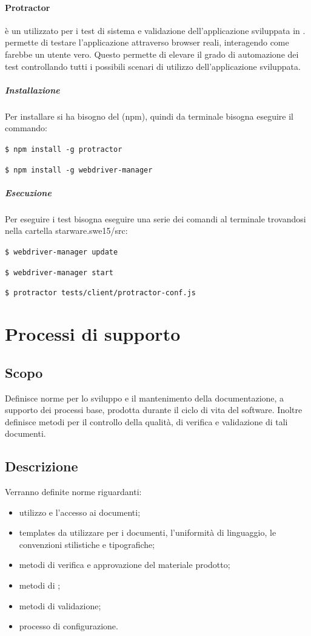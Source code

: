 \documentclass[12pt,a4paper]{article}
\begin{document}
\paragraph{Protractor} \label{protractor}
  è un  utilizzato per i test di sistema e validazione dell'applicazione sviluppata in .  permette di testare l'applicazione attraverso browser reali, interagendo come farebbe un utente vero.
Questo permette di elevare il grado di automazione dei test controllando tutti i possibili scenari di utilizzo dell'applicazione sviluppata.
\subparagraph{Installazione}
Per installare  si ha bisogno del  (npm), quindi da terminale bisogna eseguire il commando:
\begin{center}
	\texttt{\$ npm install -g protractor}
\end{center}
\begin{center}
	\texttt{\$ npm install -g webdriver-manager}  
\end{center}
\subparagraph{Esecuzione}
Per eseguire i test bisogna eseguire una serie dei comandi al terminale trovandosi nella cartella starware.swe15/src: 
\begin{center}
	\texttt{\$ webdriver-manager update}
\end{center}
\begin{center}
	\texttt{\$ webdriver-manager start}
\end{center}
\begin{center}
	\texttt{\$ protractor tests/client/protractor-conf.js}
\end{center}
\newpage

\section{Processi di supporto}

\subsection{Scopo}
Definisce norme per lo sviluppo e il mantenimento della documentazione, a supporto dei processi base, prodotta durante il ciclo di vita del software. Inoltre definisce metodi per il controllo della qualità, di verifica e validazione di tali documenti.

\subsection{Descrizione}
Verranno definite norme riguardanti:
\begin{itemize}
	\item utilizzo e l'accesso ai documenti;
	\item templates da utilizzare per i documenti, l'uniformità di linguaggio, le convenzioni stilistiche e tipografiche;
	\item metodi di verifica e approvazione del materiale prodotto;
	\item metodi di ;
	\item metodi di validazione;
	\item processo di configurazione.
\end{itemize}
\end{document}
